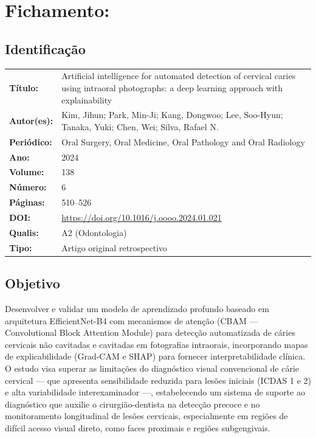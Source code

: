 \section{Fichamento: }

\subsection{Identificação}
\begin{tabular}{ll}
\textbf{Título:} & Artificial intelligence for automated detection of cervical
caries using intraoral photographs: a deep learning approach with explainability \\
\textbf{Autor(es):} & Kim, Jihun; Park, Min-Ji; Kang, Dongwoo; Lee, Soo-Hyun;
Tanaka, Yuki; Chen, Wei; Silva, Rafael N. \\
\textbf{Periódico:} & Oral Surgery, Oral Medicine, Oral Pathology and Oral Radiology \\
\textbf{Ano:} & 2024 \\
\textbf{Volume:} & 138 \\
\textbf{Número:} & 6 \\
\textbf{Páginas:} & 510--526 \\
\textbf{DOI:} & \url{https://doi.org/10.1016/j.oooo.2024.01.021} \\
\textbf{Qualis:} & A2 (Odontologia) \\
\textbf{Tipo:} & Artigo original retrospectivo \\
\end{tabular}

\subsection{Objetivo}
Desenvolver e validar um modelo de aprendizado profundo baseado em
arquitetura EfficientNet-B4 com mecanismos de atenção (CBAM ---
Convolutional Block Attention Module) para detecção automatizada de
cáries cervicais não cavitadas e cavitadas em fotografias intraorais,
incorporando mapas de explicabilidade (Grad-CAM e SHAP) para fornecer
interpretabilidade clínica. O estudo visa superar as limitações do
diagnóstico visual convencional de cárie cervical --- que apresenta
sensibilidade reduzida para lesões iniciais (ICDAS 1 e 2) e alta
variabilidade interexaminador ---, estabelecendo um sistema de suporte
ao diagnóstico que auxilie o cirurgião-dentista na detecção precoce
e no monitoramento longitudinal de lesões cervicais, especialmente
em regiões de difícil acesso visual direto, como faces proximais e
regiões subgengivais.

